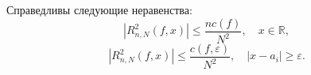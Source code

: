 \begin{lemma}
	Справедливы следующие неравенства:
	\begin{equation}
	\left|R_{n,N}^{2}(f,x)\right|\leq\frac{nc(f)}{N^2},\quad x\in\mathbb{R},\label{eq:Lemma3_firsteq}
	\end{equation}
	\begin{equation}
	\left|R_{n,N}^{2}(f,x)\right|\leq\frac{c(f,\varepsilon)}{N^{2}},\quad\left|x-a_{i}\right|\geq\varepsilon.\label{eq:Lemma3_secondeq}
	\end{equation}
\end{lemma}



